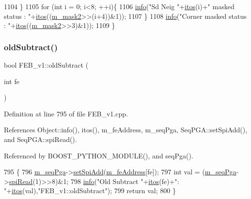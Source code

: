 \begin{DoxyCode}
1104   \}
1105   \textcolor{keywordflow}{for} (\textcolor{keywordtype}{int} i = 0; i<8; ++i)\{
1106     \hyperlink{classObject_a644fd329ea4cb85f54fa6846484b84a8}{info}(\textcolor{stringliteral}{"Sd Neig "}+\hyperlink{Tools_8h_af330027dbdafb9a30768b3613c553e60}{itos}(i)+\textcolor{stringliteral}{" masked status : "}+\hyperlink{Tools_8h_af330027dbdafb9a30768b3613c553e60}{itos}((\hyperlink{classFEB__v1_a25f03f6de00618dd575fc1f77a9af9ee}{m\_mask2}>>(i+4))&1));
1107   \}
1108   \hyperlink{classObject_a644fd329ea4cb85f54fa6846484b84a8}{info}(\textcolor{stringliteral}{"Corner masked status : "}+\hyperlink{Tools_8h_af330027dbdafb9a30768b3613c553e60}{itos}((\hyperlink{classFEB__v1_a25f03f6de00618dd575fc1f77a9af9ee}{m\_mask2}>>3)&1));
1109 \}
\end{DoxyCode}
\mbox{\label{classFEB__v1_a5b277ace76b9e511c055ad94d241dd61}} 
\subsubsection{\texorpdfstring{old\+Subtract()}{oldSubtract()}}
{\footnotesize\ttfamily bool F\+E\+B\+\_\+v1\+::old\+Subtract (\begin{DoxyParamCaption}\item[{int}]{fe }\end{DoxyParamCaption})}



Definition at line 795 of file F\+E\+B\+\_\+v1.\+cpp.



References Object\+::info(), itos(), m\+\_\+fe\+Address, m\+\_\+seq\+Pga, Seq\+P\+G\+A\+::set\+Spi\+Add(), and Seq\+P\+G\+A\+::spi\+Read().



Referenced by B\+O\+O\+S\+T\+\_\+\+P\+Y\+T\+H\+O\+N\+\_\+\+M\+O\+D\+U\+L\+E(), and seq\+Pga().


\begin{DoxyCode}
795                                 \{
796   \hyperlink{classFEB__v1_a6c7804ac86796f233a8393043adf2e77}{m\_seqPga}->\hyperlink{classSeqPGA_ac998ce3a6d9b5f2e88cc8393f8c1df53}{setSpiAdd}(\hyperlink{classFEB__v1_a4e1945c2d5b434125f375e9d0fc6d99f}{m\_feAddress}[fe]);
797   \textcolor{keywordtype}{int} val = (\hyperlink{classFEB__v1_a6c7804ac86796f233a8393043adf2e77}{m\_seqPga}->\hyperlink{classSeqPGA_ab3d0e5e5d4014bc7a92588a76b8713d4}{spiRead}(1)>>8)&1;
798   \hyperlink{classObject_a644fd329ea4cb85f54fa6846484b84a8}{info}(\textcolor{stringliteral}{"Old Subtract "}+\hyperlink{Tools_8h_af330027dbdafb9a30768b3613c553e60}{itos}(fe)+\textcolor{stringliteral}{": "}+\hyperlink{Tools_8h_af330027dbdafb9a30768b3613c553e60}{itos}(val),\textcolor{stringliteral}{"FEB\_v1::oldSubtract"});
799   \textcolor{keywordflow}{return} val;
800 \}
\end{DoxyCode}
\mbox{\label{classFEB__v1_aa9a047f616c6affac88a8d9ec984013f}} 
